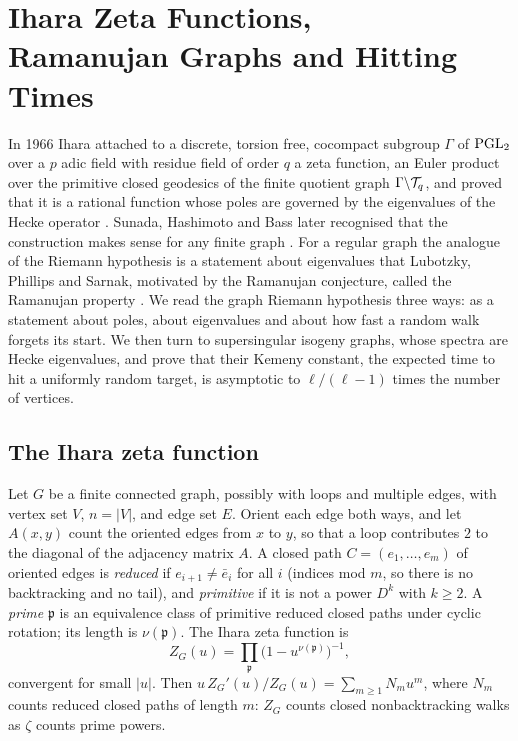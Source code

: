 \chapter[Ihara Zeta Functions, Ramanujan Graphs and Hitting Times]{Ihara Zeta Functions,\\ Ramanujan Graphs and Hitting Times}\label{ch:08}

In 1966 Ihara attached to a discrete, torsion free, cocompact subgroup $\Gamma$ of $\mathrm{PGL}_2$ over a $p$ adic field with residue field of order $q$ a zeta function, an Euler product over the primitive closed geodesics of the finite quotient graph $\Gamma\backslash\mathcal{T}_q$, and proved that it is a rational function whose poles are governed by the eigenvalues of the Hecke operator \cite{ihara1966}. Sunada, Hashimoto and Bass later recognised that the construction makes sense for any finite graph \cite{sunada1986,hashimoto1989,bass1992}. For a regular graph the analogue of the Riemann hypothesis is a statement about eigenvalues that Lubotzky, Phillips and Sarnak, motivated by the Ramanujan conjecture, called the Ramanujan property \cite{lps1988}. We read the graph Riemann hypothesis three ways: as a statement about poles, about eigenvalues and about how fast a random walk forgets its start. We then turn to supersingular isogeny graphs, whose spectra are Hecke eigenvalues, and prove that their Kemeny constant, the expected time to hit a uniformly random target, is asymptotic to $\ell/(\ell-1)$ times the number of vertices.

\section{The Ihara zeta function}

Let $G$ be a finite connected graph, possibly with loops and multiple edges, with vertex set $V$, $n=|V|$, and edge set $E$. Orient each edge both ways, and let $A(x,y)$ count the oriented edges from $x$ to $y$, so that a loop contributes $2$ to the diagonal of the adjacency matrix $A$. A closed path $C=(e_1,\dots,e_m)$ of oriented edges is \emph{reduced} if $e_{i+1}\ne\bar e_i$ for all $i$ (indices mod $m$, so there is no backtracking and no tail), and \emph{primitive} if it is not a power $D^k$ with $k\ge2$. A \emph{prime} $\mathfrak p$ is an equivalence class of primitive reduced closed paths under cyclic rotation; its length is $\nu(\mathfrak p)$. The Ihara zeta function is
\[
Z_G(u)=\prod_{\mathfrak p}\bigl(1-u^{\nu(\mathfrak p)}\bigr)^{-1},
\]
convergent for small $|u|$. Then $u\,Z_G'(u)/Z_G(u)=\sum_{m\ge1}N_mu^m$, where $N_m$ counts reduced closed paths of length $m$: $Z_G$ counts closed nonbacktracking walks as $\zeta$ counts prime powers.

